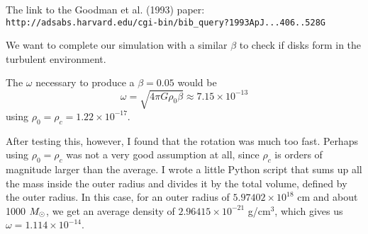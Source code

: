 \documentclass[11pt,letterpaper]{article}
\begin{document}
The link to the Goodman et al. (1993) paper:\\
{\tt http://adsabs.harvard.edu/cgi-bin/bib\_query?1993ApJ...406..528G}

We want to complete our simulation with a similar $\beta$ to check if disks form in the turbulent environment.

The $\omega$ necessary to produce a $\beta = 0.05$ would be
\begin{equation}
\omega = \sqrt{4 \pi G \rho_0 \beta} \approx 7.15\times 10^{-13}
\end{equation}
using $\rho_0 = \rho_c = 1.22\times10^{-17}$.

After testing this, however, I found that the rotation was much too fast. Perhaps using $\rho_0 = \rho_c$ was not a very good assumption at all, since $\rho_c$ is orders of magnitude larger than the average. I wrote a little Python script that sums up all the mass inside the outer radius and divides it by the total volume, defined by the outer radius. In this case, for an outer radius of $5.97402\times 10^{18}$ cm and about 1000 $M_\odot$, we get an average density of $2.96415\times 10^{-21}$ g/cm$^3$, which gives us $\omega = 1.114 \times 10^{-14}$.
\end{document}
